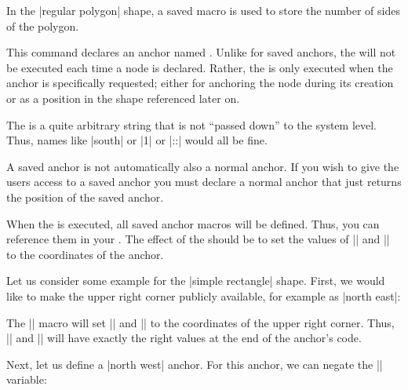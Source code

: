 \begin{command}{\pgfdeclareshape{}}
\begin{command}{\savedmacro{}}
        In the |regular polygon| shape, a saved macro is used to store the
        number of sides of the polygon.
\begin{codeexample}
\savedmacro{\sides}{\let\sides\pgfpolygonsides}
\end{codeexample}
    \end{command}
    \begin{command}{\anchor{}}
        This command declares an anchor named . Unlike for saved
        anchors, the  will not be executed each time a node is
        declared. Rather, the  is only executed when the anchor is
        specifically requested; either for anchoring the node during its
        creation or as a position in the shape referenced later on.

        The  is a quite arbitrary string that is not ``passed down''
        to the system level. Thus, names like |south| or |1| or |::| would all
        be fine.

        A saved anchor is not automatically also a normal anchor. If you wish
        to give the users access to a saved anchor you must declare a normal
        anchor that just returns the position of the saved anchor.

        When the  is executed, all saved anchor macros will be
        defined. Thus, you can reference them in your . The effect
        of the  should be to set the values of |\pgf@x| and |\pgf@y|
        to the coordinates of the anchor.

        Let us consider some example for the |simple rectangle| shape. First,
        we would like to make the upper right corner publicly available, for
        example as |north east|:
\begin{codeexample}
\end{codeexample}

        The |\upperrightcorner| macro will set |\pgf@x| and |\pgf@y| to the
        coordinates of the upper right corner. Thus, |\pgf@x| and |\pgf@y| will
        have exactly the right values at the end of the anchor's code.

        Next, let us define a |north west| anchor. For this anchor, we can
        negate the |\pgf@x| variable:
\begin{codeexample}
\end{codeexample}


\end{command}
\end{command}
